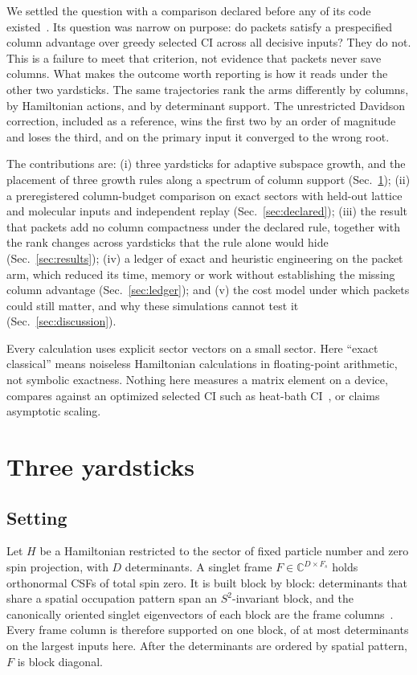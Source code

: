 \documentclass[aps,pra,reprint,superscriptaddress,nofootinbib,floatfix,
  showkeys,raggedbottom]{revtex4-2}
\begin{document}
We settled the question with a comparison declared before any of its code
existed~\cite{nosek2018preregistration}. Its question was narrow on purpose:
do packets satisfy a prespecified column advantage over greedy selected CI
across all decisive inputs? They do not. This is a failure to meet that
criterion, not evidence that packets never save columns. What
makes the outcome worth reporting is how it reads under the other two
yardsticks. The same trajectories rank the arms differently by columns, by
Hamiltonian actions, and by determinant support. The unrestricted Davidson
correction, included as a reference, wins the first two by an order of
magnitude and loses the third, and on the primary input it converged to the
wrong root.

The contributions are:
(i) three yardsticks for adaptive subspace growth, and the placement of three
growth rules along a spectrum of column support (Sec.~\ref{sec:yardsticks});
(ii) a preregistered column-budget comparison on exact sectors with held-out
lattice and molecular inputs and independent replay
(Sec.~\ref{sec:declared});
(iii) the result that packets add no column compactness under the declared
rule, together with the rank changes across yardsticks that the rule alone
would hide (Sec.~\ref{sec:results});
(iv) a ledger of exact and heuristic engineering on the packet arm, which
reduced its time, memory or work without establishing the missing column advantage
(Sec.~\ref{sec:ledger}); and
(v) the cost model under which packets could still matter, and why these
simulations cannot test it (Sec.~\ref{sec:discussion}).

Every calculation uses explicit sector vectors on a small sector. Here
``exact classical'' means noiseless Hamiltonian calculations in floating-point
arithmetic, not symbolic exactness. Nothing here measures a matrix element on a
device, compares against an optimized selected CI such as heat-bath
CI~\cite{holmes2016hci}, or claims asymptotic scaling.

\section{Three yardsticks}
\label{sec:yardsticks}

\subsection{Setting}

Let $H$ be a Hamiltonian restricted to the sector of fixed particle number and
zero spin projection, with $D$ determinants. A singlet frame
$F\in\mathbb{C}^{D\times F_s}$ holds orthonormal CSFs of total spin zero. It is
built block by block: determinants that share a spatial occupation pattern
span an $S^2$-invariant block, and the canonically oriented singlet
eigenvectors of each block are the frame columns~\cite{pauncz1979spin}. Every
frame column is therefore supported on one block, of at most
\pkPrimarySpinBlock{} determinants on the largest inputs here. After the
determinants are ordered by spatial pattern, $F$ is block diagonal.
\end{document}
